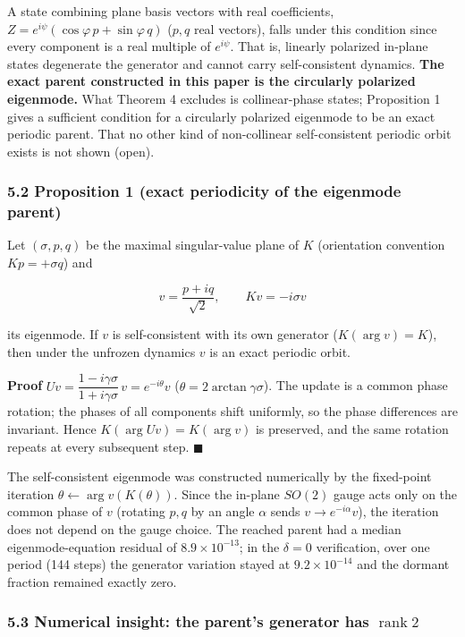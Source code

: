 \documentclass[
  a4paper,
]{article}
\begin{document}
A state combining plane basis vectors with real coefficients,
\(Z=e^{i\psi}(\cos\varphi\,p+\sin\varphi\,q)\) (\(p,q\) real vectors),
falls under this condition since every component is a real multiple of
\(e^{i\psi}\). That is, linearly polarized in-plane states degenerate
the generator and cannot carry self-consistent dynamics. \textbf{The
exact parent constructed in this paper is the circularly polarized
eigenmode.} What Theorem 4 excludes is collinear-phase states;
Proposition 1 gives a sufficient condition for a circularly polarized
eigenmode to be an exact periodic parent. That no other kind of
non-collinear self-consistent periodic orbit exists is not shown (open).

\subsubsection{5.2 Proposition 1 (exact periodicity of the eigenmode
parent)}\label{proposition-1-exact-periodicity-of-the-eigenmode-parent}

Let \((\sigma,p,q)\) be the maximal singular-value plane of \(K\)
(orientation convention \(Kp=+\sigma q\)) and

\[
v=\frac{p+iq}{\sqrt2},
\qquad
Kv=-i\sigma v
\]

its eigenmode. If \(v\) is self-consistent with its own generator
(\(K(\arg v)=K\)), then under the unfrozen dynamics \(v\) is an exact
periodic orbit.

\textbf{Proof}
\(Uv=\dfrac{1-i\gamma\sigma}{1+i\gamma\sigma}\,v=e^{-i\theta}v\)
(\(\theta=2\arctan\gamma\sigma\)). The update is a common phase
rotation; the phases of all components shift uniformly, so the phase
differences are invariant. Hence \(K(\arg Uv)=K(\arg v)\) is preserved,
and the same rotation repeats at every subsequent step. \(\blacksquare\)

The self-consistent eigenmode was constructed numerically by the
fixed-point iteration \(\theta\leftarrow\arg v(K(\theta))\). Since the
in-plane \(SO(2)\) gauge acts only on the common phase of \(v\)
(rotating \(p,q\) by an angle \(\alpha\) sends \(v\to e^{-i\alpha}v\)),
the iteration does not depend on the gauge choice. The reached parent
had a median eigenmode-equation residual of \(8.9\times10^{-13}\); in
the \(\delta=0\) verification, over one period (144 steps) the generator
variation stayed at \(9.2\times10^{-14}\) and the dormant fraction
remained exactly zero.

\subsubsection{\texorpdfstring{5.3 Numerical insight: the parent's
generator has
\(\operatorname{rank}2\)}{5.3 Numerical insight: the parent's generator has \textbackslash operatorname\{rank\}2}}\label{numerical-insight-the-parents-generator-has-operatornamerank2}
\end{document}
